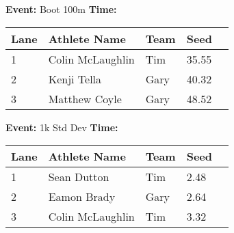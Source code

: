 \documentclass[10pt]{article}
\begin{document}
\textbf{Event:} Boot 100m \quad \textbf{Time:}  

\vspace{1em}
\begin{tabular}{@{}lllll@{}}
\toprule

\textbf{Lane} & \textbf{Athlete Name} & \textbf{Team} & \textbf{Seed} \\
\midrule
1 & Colin McLaughlin & Tim & 35.55 &\\
2 & Kenji Tella & Gary & 40.32 &\\
3 & Matthew Coyle & Gary & 48.52 &\\
\bottomrule
\end{tabular}
\vspace{2.5em}


\textbf{Event:} 1k Std Dev \quad \textbf{Time:}  

\vspace{1em}
\begin{tabular}{@{}lllll@{}}
\toprule

\textbf{Lane} & \textbf{Athlete Name} & \textbf{Team} & \textbf{Seed} \\
\midrule
1 & Sean Dutton & Tim & 2.48 &\\
2 & Eamon Brady & Gary & 2.64 &\\
3 & Colin McLaughlin & Tim & 3.32 &\\
\bottomrule
\end{tabular}
\vspace{2.5em}
\end{document}
